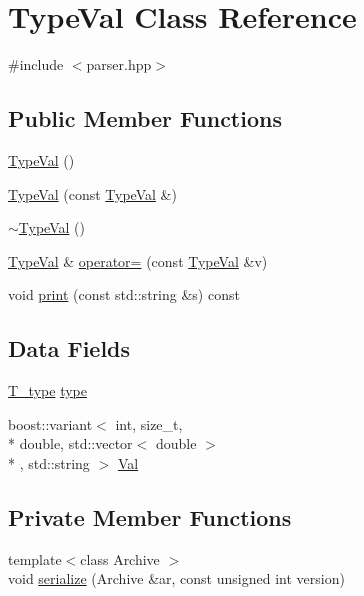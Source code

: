 \hypertarget{classTypeVal}{\section{Type\-Val Class Reference}
\label{classTypeVal}
}


{\ttfamily \#include $<$parser.\-hpp$>$}

\subsection*{Public Member Functions}
\begin{DoxyCompactItemize}
\item 
\hyperlink{classTypeVal_a584555ce9b88dfa20ab05d15980dcaf9}{Type\-Val} ()
\item 
\hyperlink{classTypeVal_a9678b5a8d9ad157f0a813aca8ddd565e}{Type\-Val} (const \hyperlink{classTypeVal}{Type\-Val} \&)
\item 
\hyperlink{classTypeVal_a99d6508946d07b5a4cc7b2419c838445}{$\sim$\-Type\-Val} ()
\item 
\hyperlink{classTypeVal}{Type\-Val} \& \hyperlink{classTypeVal_a001121d22f62c3c895760f23691666e6}{operator=} (const \hyperlink{classTypeVal}{Type\-Val} \&v)
\item 
void \hyperlink{classTypeVal_a5cc7b3e408b42f6ba0c0c6a339c4282e}{print} (const std\-::string \&s) const 
\end{DoxyCompactItemize}
\subsection*{Data Fields}
\begin{DoxyCompactItemize}
\item 
\hyperlink{parser_8hpp_a90856b8fb3f1a65845ffec1ec2884c0f}{T\-\_\-type} \hyperlink{classTypeVal_abd5dd71d2a5e2ce2f3b1f018068108ff}{type}
\item 
boost\-::variant$<$ int, size\-\_\-t, \\*
double, std\-::vector$<$ double $>$\\*
, std\-::string $>$ \hyperlink{classTypeVal_abafd45e0ebbcb8129080cddbea3b3d7b}{Val}
\end{DoxyCompactItemize}
\subsection*{Private Member Functions}
\begin{DoxyCompactItemize}
\item 
{\footnotesize template$<$class Archive $>$ }\\void \hyperlink{classTypeVal_a2278bab9356abb527a4758f32645142d}{serialize} (Archive \&ar, const unsigned int version)
\end{DoxyCompactItemize}

